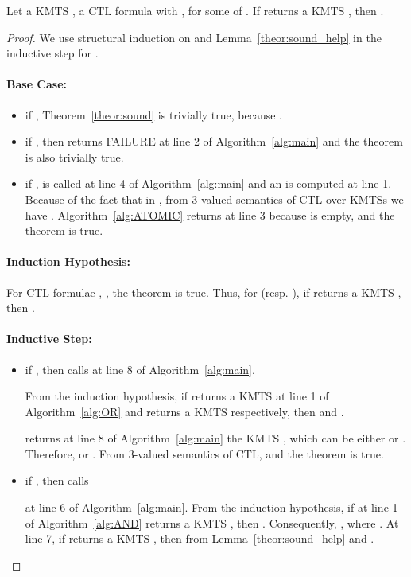 \begin{thm}[Soundness]
\label{theor:sound}
Let a KMTS , a CTL formula  with 
, for some  of 
.  If  returns a 
KMTS , then .  
\end{thm}
\begin{proof}
We use structural induction on  and Lemma~\ref{theor:sound_help}
in the inductive step for .  

\paragraph{Base Case:}
\begin{itemize}
\item if , Theorem~\ref{theor:sound} is trivially true, because 
.     
\item if , then  
returns FAILURE at line 2 of Algorithm~\ref{alg:main} and the theorem is also 
trivially true.    
\item if ,  
is called at line 4 of Algorithm~\ref{alg:main} and an  is computed at line 1.  Because of the fact that 
 in , from 3-valued semantics 
of CTL over KMTSs we have .    
Algorithm~\ref{alg:ATOMIC} returns  at line 3 because  is empty, 
and the theorem is true.    
\end{itemize}

\paragraph{Induction Hypothesis:}
For CTL formulae , , the theorem is true.  Thus, for  
(resp. ), if  returns a 
KMTS , then .      

\paragraph{Inductive Step:}
\begin{itemize}
\item if , then  
calls  at 
line 8 of Algorithm~\ref{alg:main}.    

From the induction hypothesis, if 
returns a KMTS  at line 1 of Algorithm~\ref{alg:OR} 
and  returns a KMTS  
respectively, then  and 
.  
 
returns at line 8 of Algorithm~\ref{alg:main} the KMTS , 
which can be either  or .  Therefore, 
 or 
.  
From 3-valued semantics of CTL, 
 and the theorem is true. 

\item if , then 
 calls 
 
at line 6 of Algorithm~\ref{alg:main}.  From the induction 
hypothesis, if at line 1 of Algorithm~\ref{alg:AND} 
 returns a 
KMTS , then .  
Consequently, , where 
.  
At line 7, if  
returns a KMTS , then from Lemma~\ref{theor:sound_help} 
 and .


\end{itemize}
\end{proof}
